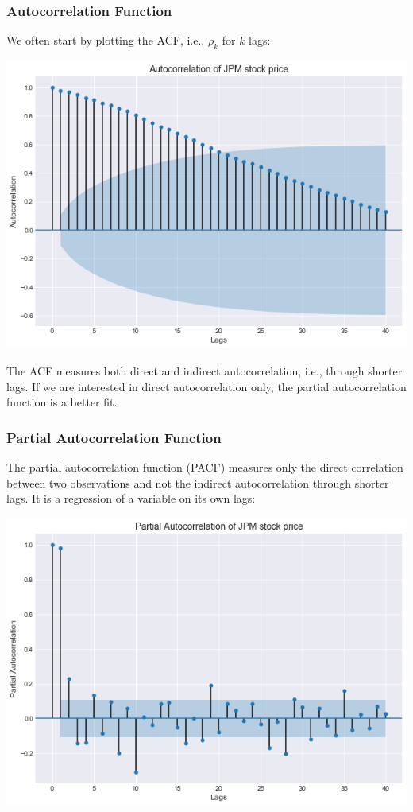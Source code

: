 \documentclass[xcolor=dvipsnames, english, 8pt]{beamer}
\begin{document}
\begin{frame}
\frametitle{Autocorrelation Function}
We often start by plotting the ACF, i.e., $\rho_k $ for $k$ lags: \vspace{0.25cm}\\     
    \begin{center}
    \includegraphics[scale=0.35]{ACF}
\end{center}
The ACF measures both direct and indirect autocorrelation, i.e., through shorter lags. If we are interested in direct autocorrelation only, the {\color{ubRed} partial autocorrelation function} is a better fit.
\end{frame}

\begin{frame}
\frametitle{Partial Autocorrelation Function}
The partial autocorrelation function (PACF) measures only the direct correlation between two observations and not the indirect autocorrelation through shorter lags. It is a regression of a variable on its own lags:\vspace{0.25cm}\\
    \begin{center}
    \includegraphics[scale=0.35]{PACF}

\end{center}
    \end{frame}
\end{document}
